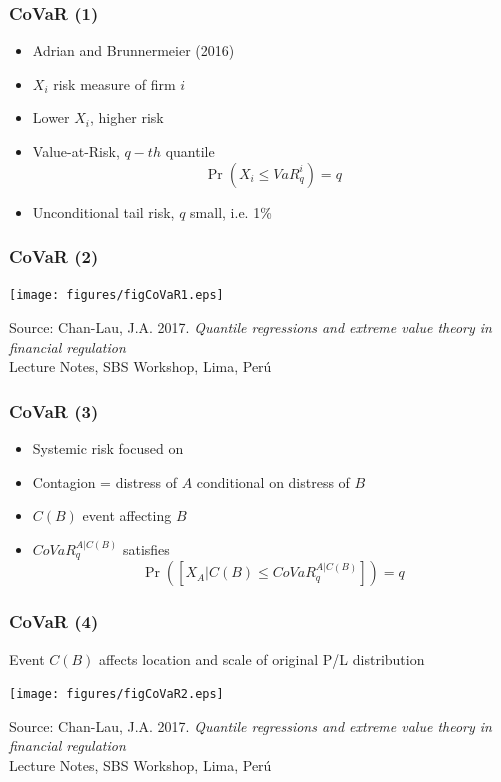 \documentclass[aspectratio=43,dvipsnames,usenames, svgnames]{beamer}
\begin{document}
\begin{frame} %
\frametitle{CoVaR (1)}
\begin{itemize}
	\item Adrian and Brunnermeier (2016)
	\smallskip
	\item $X_i$ risk measure of firm $i$
	\smallskip
	\item Lower $X_i$, higher risk
	\smallskip
	\item Value-at-Risk, $q-th$ quantile
	\begin{equation*}
		\Pr \left(X_i \leq VaR_{q}^i \right) = q
	\end{equation*}
	\item Unconditional tail risk, $q$ small, i.e. 1\%
\end{itemize}
\end{frame}

\begin{frame} %
\frametitle{CoVaR (2)}
\begin{center}
	\texttt{[image: figures/figCoVaR1.eps]}
\end{center}
\tiny{Source: Chan-Lau, J.A. 2017. \textit{Quantile regressions and extreme value theory in financial regulation}\\Lecture Notes, SBS Workshop, Lima, Per\'u}
\end{frame}

\begin{frame} %
\frametitle{CoVaR (3)}
\begin{itemize}
	\item Systemic risk focused on {\color{red}{contagion}}
	\smallskip
	\item Contagion = distress of $A$ conditional on distress of $B$
	\smallskip
	\item $C(B)$ event affecting $B$
	\smallskip
	\item $CoVaR_{q}^{A|C(B)}$ satisfies
	\begin{equation*}
		\Pr \left([ X_A|C(B) \leq CoVaR_{q}^{A|C(B)}] \right) = q	
	\end{equation*}
\end{itemize}
\end{frame}

\begin{frame} %
\frametitle{CoVaR (4)}
\begin{center}
\scriptsize{Event $C(B)$ affects location and scale of original P/L distribution}
\end{center}
\begin{center}
	\texttt{[image: figures/figCoVaR2.eps]}
\end{center}
\tiny{Source: Chan-Lau, J.A. 2017. \textit{Quantile regressions and extreme value theory in financial regulation}\\Lecture Notes, SBS Workshop, Lima, Per\'u}
\end{frame}
\end{document}

